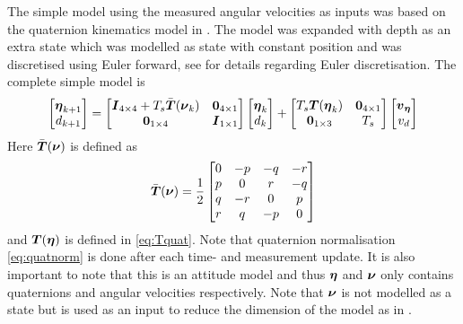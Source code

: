 The simple model using the measured angular velocities as inputs was based on the quaternion kinematics model in \citet[p. 47]{Tornqvist}. The model was expanded with depth as an extra state which was modelled as state with constant position and was discretised using Euler forward, see \citet[p. 378]{modellbygge} for details regarding Euler discretisation. The complete simple model is 
\begin{equation}
\begin{bmatrix}
\boldsymbol{\eta}_{k+1}\\
d_{k+1}
\end{bmatrix} 
=
 \begin{bmatrix}
 \boldsymbol{I}_{4\times4} + T_s \bar{\boldsymbol{T}}(\boldsymbol{\nu}_k) & \boldsymbol{0}_{4\times1}\\
 \boldsymbol{0}_{1\times4} & \boldsymbol{I}_{1\times1} 
 \end{bmatrix}
 \begin{bmatrix}
 \boldsymbol{\eta}_{k}\\
 d_k
 \end{bmatrix}
 +
  \begin{bmatrix}
  T_s \boldsymbol{T}(\boldsymbol{\eta}_{k}) & \boldsymbol{0}_{4\times1}\\
  \boldsymbol{0}_{1\times3} & T_s
  \end{bmatrix}
  \begin{bmatrix}
  \boldsymbol{v}_{\boldsymbol{\eta}}\\
  v_d 
  \end{bmatrix}
\end{equation}
Here $\bar{\boldsymbol{T}}(\boldsymbol{\nu})$ is defined as
\begin{equation}
\bar{\boldsymbol{T}}(\boldsymbol{\nu}) = \frac{1}{2}
\begin{bmatrix}
     0 &-p &-q &-r\\
     p & 0 & r &-q\\
     q &-r & 0 & p\\
     r & q &-p & 0
\end{bmatrix}
\end{equation} and $\boldsymbol{T}(\boldsymbol{\eta})$ is defined in \eqref{eq:Tquat}. Note that quaternion normalisation \eqref{eq:quatnorm} is done after each time- and measurement update.
It is also important to note that this is an attitude model and thus $\boldsymbol{\eta}$ and $\boldsymbol{\nu}$ only contains quaternions and angular velocities respectively. Note that $\boldsymbol{\nu}$ is not modelled as a state but is used as an input to reduce the dimension of the model as in \citet{Tornqvist}. 

